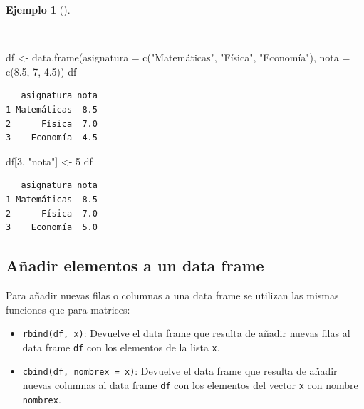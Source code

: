 \documentclass[
  a4paper,
]{scrreport}
\newenvironment{Shaded}{\begin{snugshade}}{\end{snugshade}}
\newcommand{\AttributeTok}[1]{\textcolor[rgb]{0.40,0.45,0.13}{#1}}
\newcommand{\DecValTok}[1]{\textcolor[rgb]{0.68,0.00,0.00}{#1}}
\newcommand{\FloatTok}[1]{\textcolor[rgb]{0.68,0.00,0.00}{#1}}
\newcommand{\FunctionTok}[1]{\textcolor[rgb]{0.28,0.35,0.67}{#1}}
\newcommand{\NormalTok}[1]{\textcolor[rgb]{0.00,0.23,0.31}{#1}}
\newcommand{\OtherTok}[1]{\textcolor[rgb]{0.00,0.23,0.31}{#1}}
\newcommand{\StringTok}[1]{\textcolor[rgb]{0.13,0.47,0.30}{#1}}
\theoremstyle{definition}
\theoremstyle{definition}
\newtheorem{example}{Ejemplo}[chapter]
\theoremstyle{remark}
\begin{document}
\begin{example}[]\protect\hypertarget{exm-modificacion-data-frames}{}\label{exm-modificacion-data-frames}

~

\begin{Shaded}
\begin{Highlighting}[]
\NormalTok{df }\OtherTok{\textless{}{-}} \FunctionTok{data.frame}\NormalTok{(}\AttributeTok{asignatura =} \FunctionTok{c}\NormalTok{(}\StringTok{"Matemáticas"}\NormalTok{, }\StringTok{"Física"}\NormalTok{, }\StringTok{"Economía"}\NormalTok{), }\AttributeTok{nota =} \FunctionTok{c}\NormalTok{(}\FloatTok{8.5}\NormalTok{, }\DecValTok{7}\NormalTok{, }\FloatTok{4.5}\NormalTok{))}
\NormalTok{df}
\end{Highlighting}
\end{Shaded}

\begin{verbatim}
   asignatura nota
1 Matemáticas  8.5
2      Física  7.0
3    Economía  4.5
\end{verbatim}

\begin{Shaded}
\begin{Highlighting}[]
\NormalTok{df[}\DecValTok{3}\NormalTok{, }\StringTok{"nota"}\NormalTok{] }\OtherTok{\textless{}{-}} \DecValTok{5}
\NormalTok{df}
\end{Highlighting}
\end{Shaded}

\begin{verbatim}
   asignatura nota
1 Matemáticas  8.5
2      Física  7.0
3    Economía  5.0
\end{verbatim}

\end{example}

\hypertarget{auxf1adir-elementos-a-un-data-frame}{%
\subsection{Añadir elementos a un data
frame}\label{auxf1adir-elementos-a-un-data-frame}}

Para añadir nuevas filas o columnas a una data frame se utilizan las
mismas funciones que para matrices:

\begin{itemize}
\item
  \texttt{rbind(df,\ x)}: Devuelve el data frame que resulta de añadir
  nuevas filas al data frame \texttt{df} con los elementos de la lista
  \texttt{x}.
\item
  \texttt{cbind(df,\ nombrex\ =\ x)}: Devuelve el data frame que resulta
  de añadir nuevas columnas al data frame \texttt{df} con los elementos
  del vector \texttt{x} con nombre \texttt{nombrex}.
\end{itemize}
\end{document}
